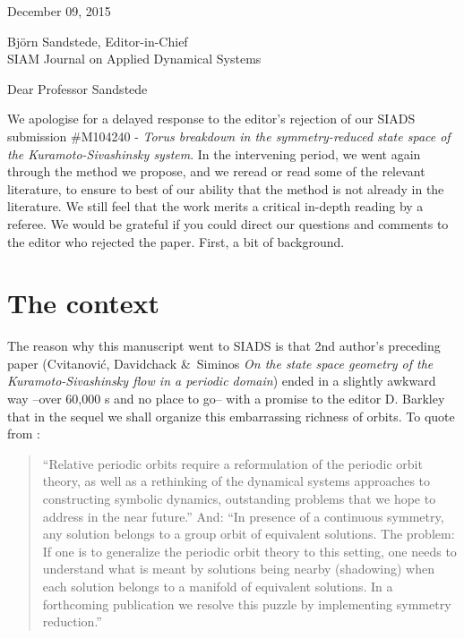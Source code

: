 \documentclass[12pt]{article}
\begin{document}
\bigskip
                    \hfill December 09, 2015

\noindent
Bj\"orn Sandstede, Editor-in-Chief\\
SIAM Journal on Applied Dynamical Systems

\bigskip
\bigskip

\noindent
Dear Professor Sandstede

\bigskip

We apologise for a delayed response to the editor's rejection of our SIADS
submission \#M104240 -
\emph{Torus breakdown in the symmetry-reduced state space of the
Kuramoto-Sivashinsky system}.
In the intervening period, we went again through the method we propose,
and we reread or read some of the relevant literature, to ensure to best
of our ability that the method is not already in the literature. We still
feel that the work merits a critical in-depth reading by a referee. We
would be grateful if you could direct our questions and comments to the
editor who rejected the paper. First, a bit of background.

\section{The context}
The reason why this manuscript went to SIADS is that 2nd author's
preceding paper (Cvitanovi{\'c}, Davidchack \&\ Siminos {\em On
the state space geometry of the {Kuramoto-Sivashinsky} flow in a periodic
domain}) ended in a slightly awkward way --over 60,000 \rpo s
and no place to go-- with a promise to the editor D. Barkley
that in the sequel we shall organize this embarrassing richness of
orbits.
To quote from :

\begin{quote}
``Relative periodic orbits require a reformulation of the periodic orbit
theory, as well as a rethinking of the dynamical systems
approaches to constructing symbolic dynamics, outstanding problems that
we hope to address in the near future.'' And:
``In presence of a continuous symmetry, any solution belongs to a group
orbit of equivalent solutions. The problem: If one is to generalize the
periodic orbit theory to this setting, one needs to understand what is
meant by solutions being nearby (shadowing) when each solution belongs to
a manifold of equivalent solutions. In a forthcoming
publication we resolve this puzzle by implementing symmetry
reduction.''
\end{quote}
\end{document}
